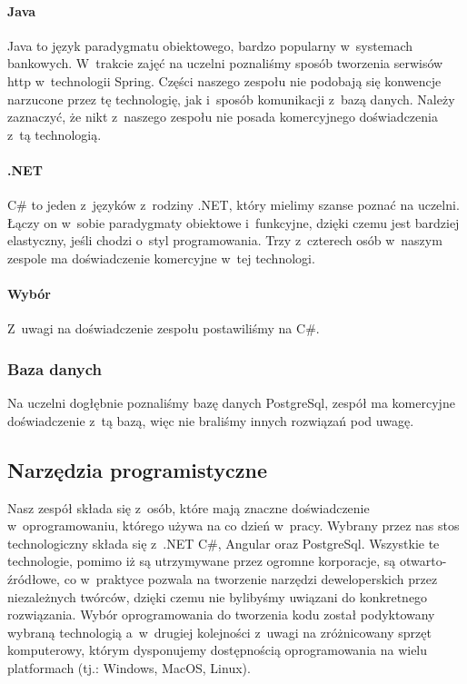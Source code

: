 \paragraph{Java}
Java to język paradygmatu obiektowego, bardzo popularny w~systemach bankowych.
W~trakcie zajęć na uczelni poznaliśmy sposób tworzenia serwisów \acrshort{http} w~technologii Spring.
Części naszego zespołu nie podobają się konwencje narzucone przez tę technologię, jak i~sposób komunikacji z~bazą danych.
Należy zaznaczyć, że nikt z~naszego zespołu nie posada komercyjnego doświadczenia z~tą technologią.

\paragraph{.NET}
C\# to jeden z~języków z~rodziny .NET, który mielimy szanse poznać na uczelni.
Łączy on w~sobie paradygmaty obiektowe i~funkcyjne, dzięki czemu jest bardziej elastyczny, jeśli chodzi o~styl programowania.
Trzy z~czterech osób w~naszym zespole ma doświadczenie komercyjne w~tej technologi.

\paragraph{Wybór}
Z~uwagi na doświadczenie zespołu postawiliśmy na C\#.

\subsubsection{Baza danych}
Na uczelni dogłębnie poznaliśmy bazę danych PostgreSql, zespół ma komercyjne doświadczenie z~tą bazą, więc nie braliśmy innych rozwiązań pod uwagę.

\subsection{Narzędzia programistyczne}
\label{subsec:narzedzia-programistyczne}
Nasz zespół składa się z~osób, które mają znaczne doświadczenie w~oprogramowaniu, którego używa na co dzień w~pracy.
Wybrany przez nas stos technologiczny składa się z~.NET C\#, Angular oraz PostgreSql.
Wszystkie te technologie, pomimo iż są utrzymywane przez ogromne korporacje, są otwarto-źródłowe, co w~praktyce pozwala na tworzenie narzędzi deweloperskich przez niezależnych twórców, dzięki czemu nie bylibyśmy uwiązani do konkretnego rozwiązania.
Wybór oprogramowania do tworzenia kodu został podyktowany wybraną technologią a~w~drugiej kolejności z~uwagi na zróżnicowany sprzęt komputerowy, którym dysponujemy  dostępnością oprogramowania na wielu platformach (tj.: Windows, MacOS, Linux).

